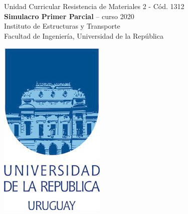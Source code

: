 \documentclass{pruebas}
\begin{document}
	
	\begin{minipage}[t]{0.85\textwidth}
		\noindent%
		Unidad Curricular Resistencia de Materiales 2 - Cód. 1312\\
		\textbf{Simulacro Primer Parcial} -- curso 2020\\
		Instituto de Estructuras y Transporte\\
		Facultad de Ingeniería, Universidad de la República\\
	\end{minipage}
	\begin{minipage}[t]{0.1\textwidth}
		\vspace{-5mm}%
		\includegraphics[width=.9\textwidth]{logo_udelar} %
	\end{minipage}
	
\end{document}
